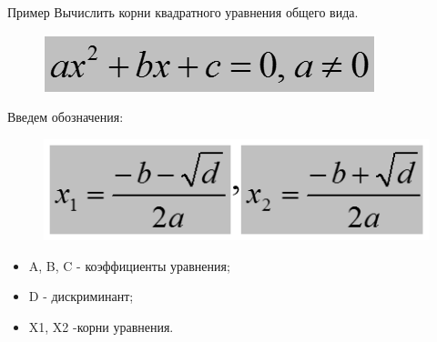 \documentclass{beamer}
\begin{document}
\begin{frame}[fragile]{Пример}
Вычислить корни квадратного уравнения общего вида.
\begin{figure}[h]
\centering
\includegraphics[scale=0.35]{images/lec03-pic08.png}
\end{figure}
Введем обозначения:
\begin{figure}[h]
\centering
\includegraphics[scale=0.35]{images/lec03-pic09.png}
\end{figure}
\begin{itemize}
\item A, B, C - коэффициенты уравнения;
\item D - дискриминант;
\item X1, X2  -корни уравнения.
\end{itemize}
\end{frame}
\end{document}
